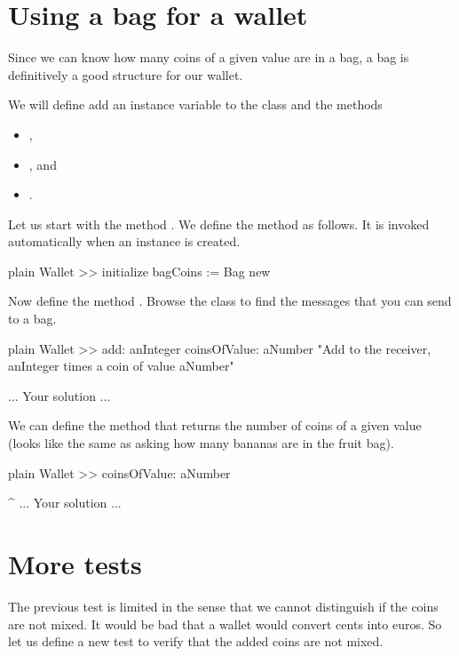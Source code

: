 \documentclass[10pt,twoside,english]{_support/latex/sbabook/sbabook}
\begin{document}
\section{Using a bag for a wallet}
Since we can know how many coins of a given value are in a bag, a bag is definitively a good structure for our wallet. 

We will define add an instance variable  to the class and the methods

\begin{itemize}
\item {}, 
\item {}, and  
\item {}.
\end{itemize}

Let us start with the method . We define the method  as follows. It is invoked automatically when an instance is created. 

\begin{displaycode}{plain}
Wallet >> initialize
	bagCoins := Bag new
\end{displaycode}

Now define the method . Browse the class  to find the messages that you can send to a bag.

\begin{displaycode}{plain}
Wallet >> add: anInteger coinsOfValue: aNumber
	"Add to the receiver, anInteger times a coin of value aNumber"
	
	... Your solution ...
\end{displaycode}

We can define the method  that returns the number of coins of a given value (looks like the same as asking how many bananas are in the fruit bag).

\begin{displaycode}{plain}
Wallet >> coinsOfValue: aNumber

	^ ... Your solution ...
\end{displaycode}
\section{More tests}
The previous test is limited in the sense that we cannot distinguish if the coins are not mixed. 
It would be bad that a wallet would convert cents into euros. So let us define a new test to verify that the added coins are not mixed. 
\end{document}
